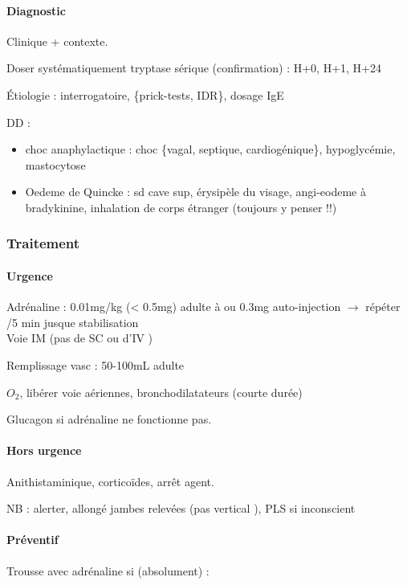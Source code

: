 \documentclass[11pt]{article}
\begin{document}
\paragraph{Diagnostic}
\label{sec:orgddd81d3}
Clinique + contexte.

Doser systématiquement tryptase sérique (confirmation) : H+0, H+1, H+24

Étiologie : interrogatoire, \{prick-tests, IDR\}, dosage IgE

DD : 

\begin{itemize}
\item choc anaphylactique : choc \{vagal, septique, cardiogénique\}, hypoglycémie, mastocytose
\item Oedeme de Quincke : sd cave sup, érysipèle du visage, angi-eodeme à
bradykinine, inhalation de corps étranger (toujours y penser !!)
\end{itemize}


\subsubsection{Traitement}
\label{sec:org52ac785}
\paragraph{Urgence}
\label{sec:org5322e6c}
Adrénaline : 0.01mg/kg (< 0.5mg) adulte à \faHospital{} ou  0.3mg
auto-injection \(\rightarrow\) répéter /5 min jusque stabilisation\\
Voie IM (pas de SC ou d'IV \danger{})

Remplissage vasc : 50-100mL adulte

\(O_2\), libérer voie aériennes, bronchodilatateurs (courte durée)

Glucagon si adrénaline ne fonctionne pas. 

\paragraph{Hors urgence}
\label{sec:org3e97b2b}
Anithistaminique, corticoïdes, arrêt agent.

NB : alerter, allongé jambes relevées (pas vertical \danger{} ), PLS si
inconscient

\paragraph{Préventif}
\label{sec:orgfd190d3}
Trousse avec adrénaline si (absolument) :
\end{document}
